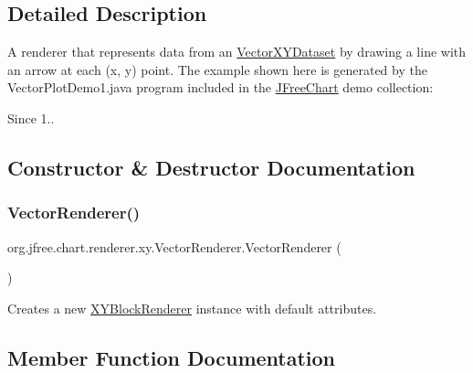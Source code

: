 \subsection{Detailed Description}
A renderer that represents data from an \mbox{\hyperlink{}{Vector\+X\+Y\+Dataset}} by drawing a line with an arrow at each (x, y) point. The example shown here is generated by the {\ttfamily Vector\+Plot\+Demo1.\+java} program included in the \mbox{\hyperlink{classorg_1_1jfree_1_1chart_1_1_j_free_chart}{J\+Free\+Chart}} demo collection\+: ~\newline
~\newline
 

\begin{DoxySince}{Since}
1.. 
\end{DoxySince}


\subsection{Constructor \& Destructor Documentation}
\mbox{\label{classorg_1_1jfree_1_1chart_1_1renderer_1_1xy_1_1_vector_renderer_aeea262d9e561b2aef809fc33a56767f9}} 
\subsubsection{\texorpdfstring{Vector\+Renderer()}{VectorRenderer()}}
{\footnotesize\ttfamily org.\+jfree.\+chart.\+renderer.\+xy.\+Vector\+Renderer.\+Vector\+Renderer (\begin{DoxyParamCaption}{ }\end{DoxyParamCaption})}

Creates a new {\ttfamily \mbox{\hyperlink{classorg_1_1jfree_1_1chart_1_1renderer_1_1xy_1_1_x_y_block_renderer}{X\+Y\+Block\+Renderer}}} instance with default attributes. 

\subsection{Member Function Documentation}
\mbox{\label{classorg_1_1jfree_1_1chart_1_1renderer_1_1xy_1_1_vector_renderer_a8fd78969b04fa8047a84faabb569e113}} 
